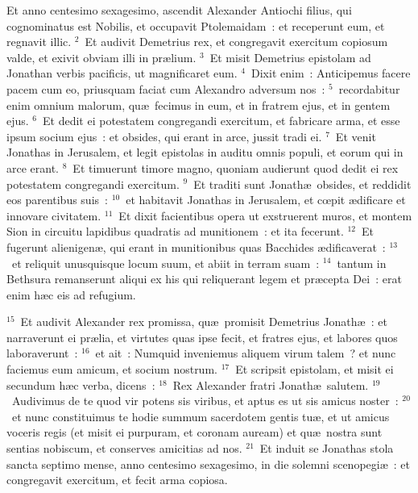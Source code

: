 \lettrine[lines=3,image=true,loversize=0.05,lraise=-0.03]{E}{}t anno centesimo sexagesimo, ascendit Alexander Antiochi filius, qui cognominatus est Nobilis, et occupavit Ptolemaidam~: et receperunt eum, et regnavit illic.
${}^{2}$~Et audivit Demetrius rex, et congregavit exercitum copiosum valde, et exivit obviam illi in pr\ae lium.
${}^{3}$~Et misit Demetrius epistolam ad Jonathan verbis pacificis, ut magnificaret eum.
${}^{4}$~Dixit enim~: Anticipemus facere pacem cum eo, priusquam faciat cum Alexandro adversum nos~:
${}^{5}$~recordabitur enim omnium malorum, qu\ae\ fecimus in eum, et in fratrem ejus, et in gentem ejus.
${}^{6}$~Et dedit ei potestatem congregandi exercitum, et fabricare arma, et esse ipsum socium ejus~: et obsides, qui erant in arce, jussit tradi ei.
${}^{7}$~Et venit Jonathas in Jerusalem, et legit epistolas in auditu omnis populi, et eorum qui in arce erant.
${}^{8}$~Et timuerunt timore magno, quoniam audierunt quod dedit ei rex potestatem congregandi exercitum.
${}^{9}$~Et traditi sunt Jonath\ae\ obsides, et reddidit eos parentibus suis~:
${}^{10}$~et habitavit Jonathas in Jerusalem, et cœpit \ae dificare et innovare civitatem.
${}^{11}$~Et dixit facientibus opera ut exstruerent muros, et montem Sion in circuitu lapidibus quadratis ad munitionem~: et ita fecerunt.
${}^{12}$~Et fugerunt alienigen\ae , qui erant in munitionibus quas Bacchides \ae dificaverat~:
${}^{13}$~et reliquit unusquisque locum suum, et abiit in terram suam~:
${}^{14}$~tantum in Bethsura remanserunt aliqui ex his qui reliquerant legem et pr\ae cepta Dei~: erat enim h\ae c eis ad refugium.


${}^{15}$~Et audivit Alexander rex promissa, qu\ae\ promisit Demetrius Jonath\ae~: et narraverunt ei pr\ae lia, et virtutes quas ipse fecit, et fratres ejus, et labores quos laboraverunt~:
${}^{16}$~et ait~: Numquid inveniemus aliquem virum talem~? et nunc faciemus eum amicum, et socium nostrum.
${}^{17}$~Et scripsit epistolam, et misit ei secundum h\ae c verba, dicens~:
${}^{18}$~Rex Alexander fratri Jonath\ae\ salutem.
${}^{19}$~Audivimus de te quod vir potens sis viribus, et aptus es ut sis amicus noster~:
${}^{20}$~et nunc constituimus te hodie summum sacerdotem gentis tu\ae , et ut amicus voceris regis (et misit ei purpuram, et coronam auream) et qu\ae\ nostra sunt sentias nobiscum, et conserves amicitias ad nos.
${}^{21}$~Et induit se Jonathas stola sancta septimo mense, anno centesimo sexagesimo, in die solemni scenopegi\ae~: et congregavit exercitum, et fecit arma copiosa.



